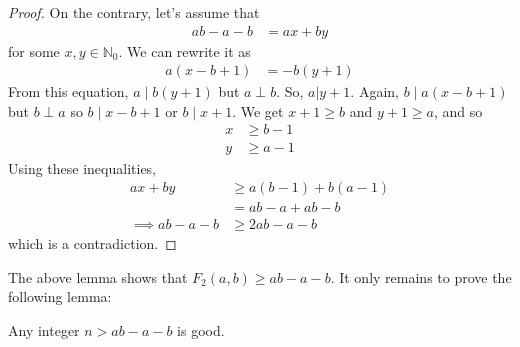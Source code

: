 	\begin{proof}
		On the contrary, let's assume that
			\begin{align*}
				ab-a-b & = ax+by
			\end{align*}
		for some $x,y\in\mathbb{N}_0$. We can rewrite it as
			\begin{align*}
				a(x-b+1) & = -b(y+1)
			\end{align*}
		From this equation, $a\mid b(y+1)$ but $a\perp b$. So, $a|y+1$. Again, $b\mid a(x-b+1)$ but $b\perp a$ so $b\mid x-b+1$ or $b\mid x+1$. We get $x+1\geq b$ and $y+1\geq a$, and so
			\begin{align*}
				 x
				 	& \geq b-1\\
				 y
				 	& \geq a-1
			\end{align*}
		Using these inequalities,
			\begin{align*}
				 ax+by
				 	& \geq a(b-1)+b(a-1) \\
					&= ab-a+ab-b\\
				\implies ab-a-b
					& \geq 2ab-a-b
			\end{align*}
		which is a contradiction.
	\end{proof}

%
%
%
The above lemma shows that $F_2(a,b) \geq ab-a-b$. It only remains to prove the following lemma:
	\begin{lemma}
		Any integer $n>ab-a-b$ is good.
	\end{lemma}

